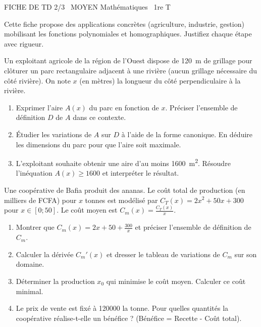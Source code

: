 \documentclass[11pt]{article}
\begin{document}
\begin{tcolorbox}[enhanced,colback=popink,colframe=popink,arc=10pt,boxrule=0pt,left=12pt,right=12pt,top=9pt,bottom=9pt]
{\color{white}\popxbold\small FICHE DE TD 2/3 \textbullet\ MOYEN \hfill Mathématiques \textbullet\ 1re T\par}
\end{tcolorbox}
\vspace{4pt}
\noindent Cette fiche propose des applications concrètes (agriculture, industrie, gestion) mobilisant les fonctions polynomiales et homographiques. Justifiez chaque étape avec rigueur.

\begin{exercice}
Un exploitant agricole de la région de l'Ouest dispose de \SI{120}{\meter} de grillage pour clôturer un parc rectangulaire adjacent à une rivière (aucun grillage nécessaire du côté rivière). On note $x$ (en mètres) la longueur du côté perpendiculaire à la rivière.
\begin{enumerate}
    \item Exprimer l'aire $A(x)$ du parc en fonction de $x$. Préciser l'ensemble de définition $D$ de $A$ dans ce contexte.
    \item Étudier les variations de $A$ sur $D$ à l'aide de la forme canonique. En déduire les dimensions du parc pour que l'aire soit maximale.
    \item L'exploitant souhaite obtenir une aire d'au moins \SI{1600}{\meter\squared}. Résoudre l'inéquation $A(x) \ge 1600$ et interpréter le résultat.
\end{enumerate}
\end{exercice}

\begin{exercice}
Une coopérative de Bafia produit des ananas. Le coût total de production (en milliers de FCFA) pour $x$ tonnes est modélisé par $C_T(x) = 2x^2 + 50x + 300$ pour $x \in [0; 50]$. Le coût moyen est $C_m(x) = \frac{C_T(x)}{x}$.
\begin{enumerate}
    \item Montrer que $C_m(x) = 2x + 50 + \frac{300}{x}$ et préciser l'ensemble de définition de $C_m$.
    \item Calculer la dérivée $C_m'(x)$ et dresser le tableau de variations de $C_m$ sur son domaine.
    \item Déterminer la production $x_0$ qui minimise le coût moyen. Calculer ce coût minimal.
    \item Le prix de vente est fixé à \SI{120000}{} la tonne. Pour quelles quantités la coopérative réalise-t-elle un bénéfice ? (Bénéfice = Recette - Coût total).
\end{enumerate}
\end{exercice}
\end{document}
